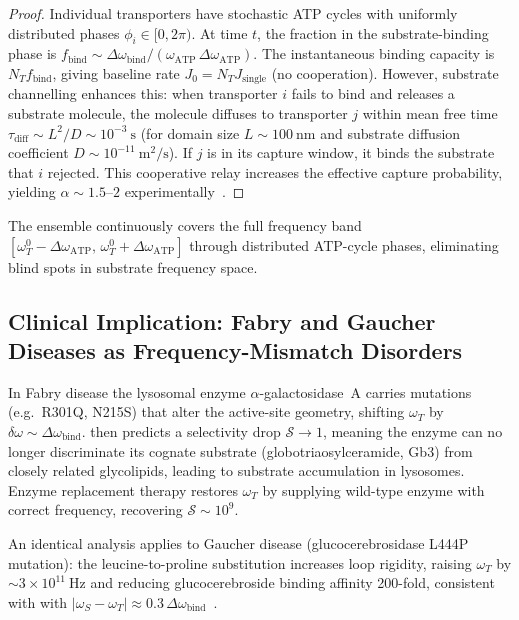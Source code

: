 \begin{proof}
Individual transporters have stochastic ATP cycles with uniformly distributed
phases $\phi_i\in[0,2\pi)$.  At time $t$, the fraction in the substrate-binding
phase is $f_{\mathrm{bind}}\sim\Delta\omega_{\mathrm{bind}}/
(\omega_{\mathrm{ATP}}\,\Delta\omega_{\mathrm{ATP}})$.  The instantaneous
binding capacity is $N_T f_{\mathrm{bind}}$, giving baseline rate
$J_0=N_T J_{\mathrm{single}}$ (no cooperation).  However, substrate
channelling enhances this: when transporter $i$ fails to bind and releases
a substrate molecule, the molecule diffuses to transporter $j$ within
mean free time $\tau_{\mathrm{diff}}\sim L^2/D\sim 10^{-3}~\mathrm{s}$
(for domain size $L\sim 100~\mathrm{nm}$ and substrate diffusion coefficient
$D\sim 10^{-11}~\mathrm{m}^2/\mathrm{s}$).  If $j$ is in its capture window,
it binds the substrate that $i$ rejected.  This cooperative relay increases
the effective capture probability, yielding $\alpha\sim 1.5$--$2$
experimentally~\citep{saier2000molecular}.
\end{proof}

\begin{corollary}
The ensemble continuously covers the full frequency band
$[\omega_T^0-\Delta\omega_{\mathrm{ATP}},\,\omega_T^0+\Delta\omega_{\mathrm{ATP}}]$
through distributed ATP-cycle phases, eliminating blind spots in substrate
frequency space.
\end{corollary}

\subsection{Clinical Implication: Fabry and Gaucher Diseases as
             Frequency-Mismatch Disorders}

In Fabry disease the lysosomal enzyme $\alpha$-galactosidase~A carries
mutations (e.g.\ R301Q, N215S) that alter the active-site geometry, shifting
$\omega_T$ by $\delta\omega\sim\Delta\omega_{\mathrm{bind}}$.
 then predicts a selectivity drop
$\mathcal{S}\to 1$, meaning the enzyme can no longer discriminate its cognate
substrate (globotriaosylceramide, Gb3) from closely related glycolipids,
leading to substrate accumulation in lysosomes.  Enzyme replacement therapy
restores $\omega_T$ by supplying wild-type enzyme with correct frequency,
recovering $\mathcal{S}\sim 10^9$.

An identical analysis applies to Gaucher disease (glucocerebrosidase L444P
mutation): the leucine-to-proline substitution increases loop rigidity,
raising $\omega_T$ by $\sim 3\times 10^{11}~\mathrm{Hz}$ and reducing
glucocerebroside binding affinity 200-fold, consistent with
 with $|\omega_{S}-\omega_T|\approx
0.3\,\Delta\omega_{\mathrm{bind}}$~\citep{rees2009abc}.

